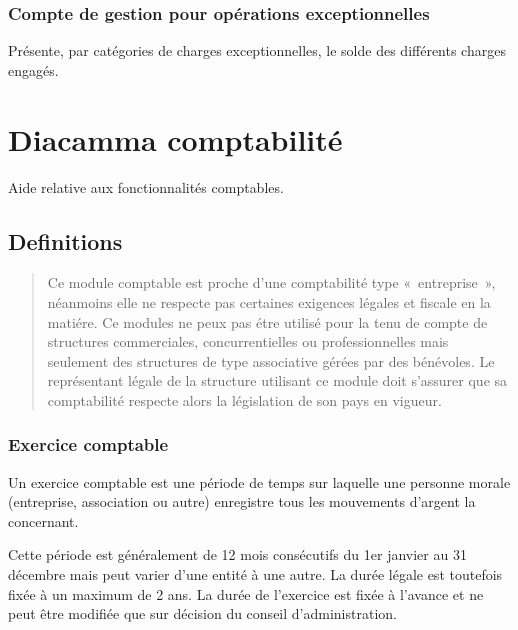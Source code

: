 \documentclass[a4paper,10pt,oneside,french]{sphinxmanual}
\begin{document}
\subsection{Compte de gestion pour opérations exceptionnelles}
\label{\detokenize{condominium/report:compte-de-gestion-pour-operations-exceptionnelles}}
Présente, par catégories de charges exceptionnelles, le solde des différents charges engagés.


\chapter{Diacamma comptabilité}
\label{\detokenize{accounting/index:diacamma-comptabilite}}\label{\detokenize{accounting/index::doc}}
Aide relative aux fonctionnalités comptables.


\section{Definitions}
\label{\detokenize{accounting/definition:definitions}}\label{\detokenize{accounting/definition::doc}}\begin{quote}

 Ce module comptable est proche d’une comptabilité type « entreprise », néanmoins elle ne respecte pas certaines exigences légales et fiscale en la matiére.
Ce modules ne peux pas étre utilisé pour la tenu de compte de structures commerciales, concurrentielles ou professionnelles mais seulement des structures de type associative gérées par des bénévoles.
Le représentant légale de la structure utilisant ce module doit s’assurer que sa comptabilité respecte alors la législation de son pays en vigueur.
\end{quote}


\subsection{Exercice comptable}
\label{\detokenize{accounting/definition:exercice-comptable}}
Un exercice comptable est une période de temps sur laquelle une
personne morale (entreprise, association ou autre) enregistre tous les
mouvements d’argent la concernant.

Cette période est généralement de 12 mois consécutifs du 1er janvier au 31 décembre mais peut varier
d’une entité à une autre. La durée légale est toutefois fixée à un
maximum de 2 ans. La durée de l’exercice est fixée à l’avance et ne
peut être modifiée que sur décision du conseil d’administration.
\end{document}
